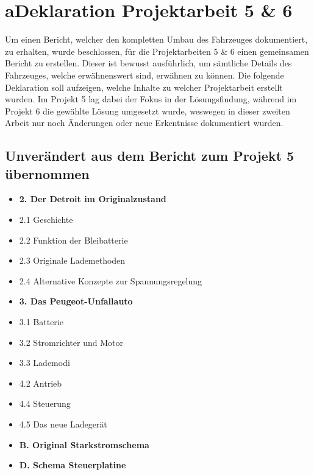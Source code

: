 \chapter*{a\quad Deklaration Projektarbeit 5 \& 6}\color{blue}
Um einen Bericht, welcher den kompletten Umbau des Fahrzeuges dokumentiert, zu erhalten, wurde beschlossen, für die Projektarbeiten 5 \& 6 einen gemeinsamen Bericht zu erstellen. Dieser ist bewusst ausführlich, um sämtliche Details des Fahrzeuges, welche erwähnenswert sind, erwähnen zu können. Die folgende Deklaration soll aufzeigen, welche Inhalte zu welcher Projektarbeit erstellt wurden. Im Projekt 5 lag dabei der Fokus in der Lösungsfindung, während im Projekt 6 die gewählte Lösung umgesetzt wurde, weswegen in dieser zweiten Arbeit nur noch Änderungen oder neue Erkentnisse dokumentiert wurden.

\section*{Unverändert aus dem Bericht zum Projekt 5 übernommen}
\begin{itemize}[noitemsep,topsep=0pt,parsep=0pt,partopsep=0pt]
\item \textbf{2. Der Detroit im Originalzustand}
\item 2.1 Geschichte
\item 2.2 Funktion der Bleibatterie
\item 2.3 Originale Lademethoden
\item 2.4 Alternative Konzepte zur Spannungsregelung
\item \textbf{3. Das Peugeot-Unfallauto}
\item 3.1 Batterie
\item 3.2 Stromrichter und Motor
\item 3.3 Lademodi
\item 4.2 Antrieb
\item 4.4 Steuerung
\item 4.5 Das neue Ladegerät
\item \textbf{B. Original Starkstromschema}
\item \textbf{D. Schema Steuerplatine}
\end{itemize}

